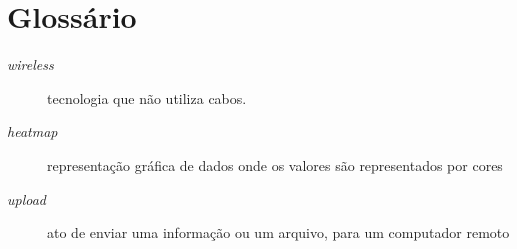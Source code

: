 \documentclass[tc,twoside]{iiufrgs}
\begin{document}

 

\chapter*{Glossário} 

\begin{description} 
	\item[\textit{wireless}] tecnologia que não utiliza cabos.
	\item[\textit{heatmap}] representação gráfica de dados onde os valores são representados por cores
	\item[\textit{upload}] ato de enviar uma informação ou um arquivo, para um computador remoto
\end{description} 


\end{document}
